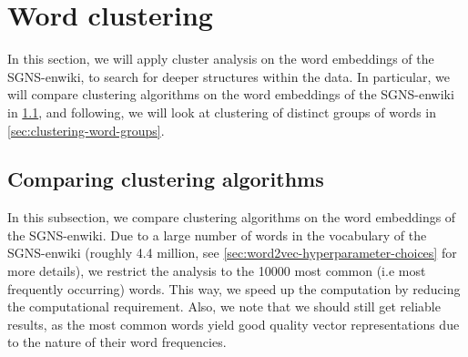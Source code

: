 \section{Word clustering}
\label{sec:analysis-of-word-embeddings-word-clustering}
In this section, we will apply cluster analysis on the word embeddings of the SGNS-enwiki, to search for deeper structures within the data. In particular, we will compare clustering algorithms on the word embeddings of the SGNS-enwiki in \cref{sec:comparing-clustering-algorithms}, and following, we will look at clustering of distinct groups of words in \cref{sec:clustering-word-groups}.

\subsection{Comparing clustering algorithms}
\label{sec:comparing-clustering-algorithms}
In this subsection, we compare clustering algorithms on the word embeddings of the SGNS-enwiki. Due to a large number of words in the vocabulary of the SGNS-enwiki (roughly 4.4 million, see \cref{sec:word2vec-hyperparameter-choices} for more details), we restrict the analysis to the 10000 most common (i.e most frequently occurring) words. This way, we speed up the computation by reducing the computational requirement. Also, we note that we should still get reliable results, as the most common words yield good quality vector representations due to the nature of their word frequencies.

